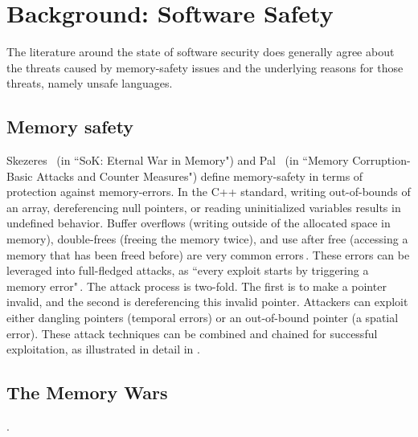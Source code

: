 \documentclass[nomenclature, english, bibtex]{kththesis}
\begin{document}

\section{Background: Software Safety}
\label{sec:software_safety}

The literature around the state of software security does  generally agree about the threats caused by memory-safety issues and the underlying reasons for those threats, namely unsafe languages. 

\subsection{Memory safety}

Skezeres \etal\,\cite{szekeres_sok_2013} (in ``SoK: Eternal War in Memory") and Pal \etal\,\cite{pal_memory_2016} (in ``Memory Corruption-Basic Attacks and Counter Measures") define \gls{memory-safety} in terms of protection against \gls{memory-error}s. 
In the C++ standard, writing out-of-bounds of an array, dereferencing null pointers, or reading uninitialized variables results in undefined behavior. Buffer overflows (writing outside of the allocated space in memory), double-frees (freeing the memory twice), and use after free (accessing a memory that has been freed before) are very common errors\,\cite{szekeres_sok_2013,scherer_engineering_2021}. 
These errors can be leveraged into full-fledged attacks, as ``every exploit starts by triggering a memory error"\,\cite{szekeres_sok_2013}. The attack process is two-fold. The first is to make a pointer invalid, and the second is dereferencing this invalid pointer. Attackers can exploit either dangling pointers (\ie temporal errors) or an out-of-bound pointer (\ie a spatial error). These attack techniques can be combined and chained for successful exploitation, as illustrated in detail in .

\subsection{The Memory Wars}.
\end{document}
